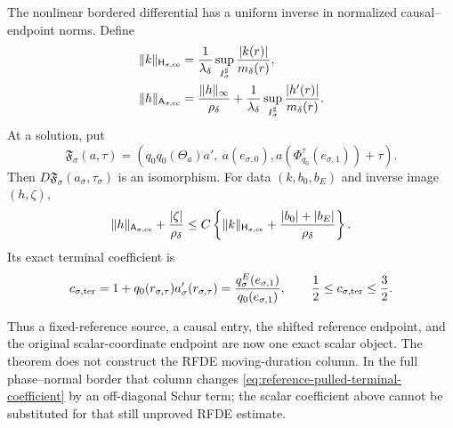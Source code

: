 \begin{theorem}
The nonlinear bordered differential has a uniform inverse in normalized
causal--endpoint norms.  Define
\begin{align}
 \|k\|_{\mathsf H_{\sigma,{\rm ce}}}
 &=\frac1{\lambda_\delta}
      \sup_{I_\sigma^\sharp}\frac{|k(r)|}{m_\delta(r)},\notag\\
 \|h\|_{\mathsf A_{\sigma,{\rm ce}}}
 &=\frac{\|h\|_\infty}{\rho_\delta}
   +\frac1{\lambda_\delta}
      \sup_{I_\sigma^\sharp}\frac{|h'(r)|}{m_\delta(r)}.
                                                        \label{eq:reference-pulled-linear-norms}
\end{align}
At a solution, put
\begin{equation}
 \mathfrak F_\sigma(a,\tau)
 =\left(q_0q_0(\Theta_a)a',\ a(e_{\sigma,0}),
    a(\Phi_{q_0}^{\tau}(e_{\sigma,1}))+\tau\right).       \label{eq:reference-pulled-bordered-map}
\end{equation}
Then \(D\mathfrak F_\sigma(a_\sigma,\tau_\sigma)\) is an isomorphism.
For data \((k,b_0,b_E)\) and inverse image \((h,\zeta)\),
\begin{equation}
 \|h\|_{\mathsf A_{\sigma,{\rm ce}}}
      +\frac{|\zeta|}{\rho_\delta}
 \le C\left\{\|k\|_{\mathsf H_{\sigma,{\rm ce}}}
      +\frac{|b_0|+|b_E|}{\rho_\delta}\right\}.           \label{eq:reference-pulled-bordered-inverse}
\end{equation}
Its exact terminal coefficient is
\begin{equation}
 c_{\sigma,{\rm ter}}
 =1+q_0(r_{\sigma,\tau})a_\sigma'(r_{\sigma,\tau})
 =\frac{q_\sigma^E(e_{\sigma,1})}{q_0(e_{\sigma,1})},
 \qquad \frac12\le c_{\sigma,{\rm ter}}\le\frac32.       \label{eq:reference-pulled-terminal-coefficient}
\end{equation}

Thus a fixed-reference source, a causal entry, the shifted reference
endpoint, and the original scalar-coordinate endpoint are now one exact
scalar object.  The theorem does not construct the RFDE moving-duration column.
In the full phase--normal border that column changes
\cref{eq:reference-pulled-terminal-coefficient} by an off-diagonal Schur
term; the scalar coefficient above cannot be substituted for that still
unproved RFDE estimate.
\end{theorem}

